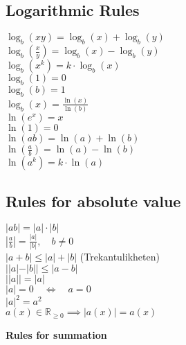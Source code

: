 \documentclass[a4paper,8pt,fleqn]{article}
\begin{document}
\begin{multicols}{3}
\begin{minipage}{\linewidth}
\subsection{Logarithmic Rules}
\(\log_b(xy) = \log_b(x) + \log_b(y)\) \\ 
\(\log_b\left(\frac{x}{y}\right) = \log_b(x) - \log_b(y)\) \\
\(\log_b(x^k) = k \cdot \log_b(x)\) \\
\(\log_b(1) = 0\) \\
\(\log_b(b) = 1\) \\
\(\log_b(x) = \frac{\ln(x)}{\ln(b)}\) \\
\(\ln(e^x) = x\) \\
\(\ln(1) = 0\) \\
\(\ln(ab) = \ln(a) + \ln(b)\) \\
\(\ln\left(\frac{a}{b}\right) = \ln(a) - \ln(b)\) \\
\(\ln(a^k) = k \cdot \ln(a)\)


\end{minipage}
\begin{minipage}{\linewidth}

\subsection{Rules for absolute value} 
\(|ab| = |a| \cdot |b|\)\\
\(\left| \frac{a}{b} \right| = \frac{|a|}{|b|}, \quad b \neq 0\)\\
\(|a + b| \leq |a| + |b|\)  (Trekantulikheten)\\
\(||a| - |b|| \leq |a - b|\)\\
\(||a|| = |a|\)\\
\(|a| = 0 \quad \Leftrightarrow \quad a = 0\)\\
\(|a|^2 = a^2\)\\
\(a(x) \in \mathbb{R}_{\geq 0} \implies |a(x)| = a(x)\)\\

\end{minipage}
\begin{minipage}{\linewidth}
\textbf{Rules for summation} 


\end{minipage}
\end{multicols}
\end{document}
